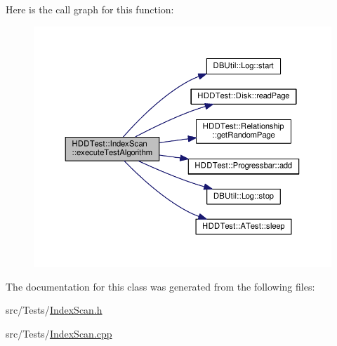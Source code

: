 Here is the call graph for this function\-:\nopagebreak
\begin{figure}[H]
\begin{center}
\leavevmode
\includegraphics[width=350pt]{class_h_d_d_test_1_1_index_scan_a63c295ffb3dd74515cf6c6583c9dc462_cgraph}
\end{center}
\end{figure}




The documentation for this class was generated from the following files\-:\begin{DoxyCompactItemize}
\item 
src/\-Tests/\hyperlink{_index_scan_8h}{Index\-Scan.\-h}\item 
src/\-Tests/\hyperlink{_index_scan_8cpp}{Index\-Scan.\-cpp}\end{DoxyCompactItemize}
